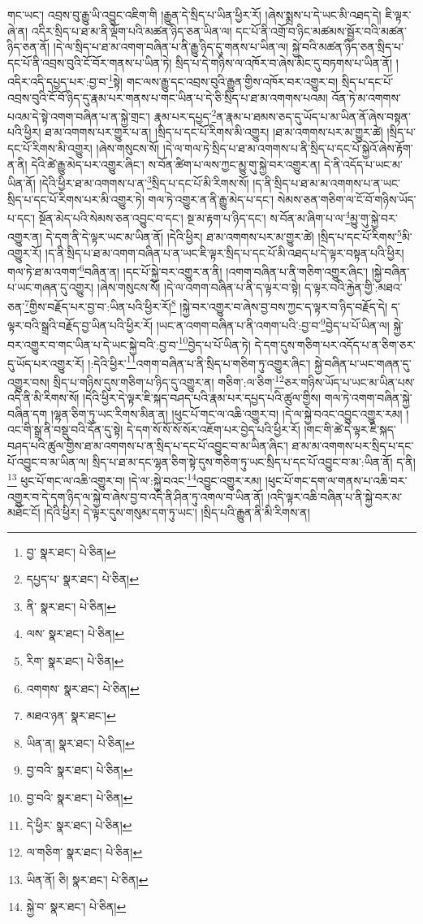 གང་ཡང་། འབྲས་བུ་རྒྱུ་ཡི་འབྱུང་འཇིག་གི །རྒྱུན་དེ་སྲིད་པ་ཡིན་ཕྱིར་རོ། །ཞེས་སྨྲས་པ་དེ་ཡང་མི་འཐད་དེ། ཇི་ལྟར་ཞེ་ན། འདིར་སྲིད་པ་ཐ་མ་ནི་ལྡོག་པའི་མཚན་ཉིད་ཅན་ཡིན་ལ། དང་པོ་ནི་འགྲོ་བ་ཉིང་མཚམས་སྦྱོར་བའི་མཚན་ཉིད་ཅན་ནོ། །དེ་ལ་སྲིད་པ་ཐ་མ་འགག་བཞིན་པ་ནི་རྒྱུ་ཉིད་དུ་གནས་པ་ཡིན་ལ། སྐྱེ་བའི་མཚན་ཉིད་ཅན་སྲིད་པ་དང་པོ་ནི་འབྲས་བུའི་ངོ་བོར་གནས་པ་ཡིན་ཏེ། སྲིད་པ་དེ་གཉིས་ལ་འཁོར་བ་ཞེས་མིང་དུ་བཏགས་པ་ཡིན་ནོ། །འདིར་འདི་དཔྱད་པར་:བྱ་བ་\footnote{བྱ་  སྣར་ཐང་།  པེ་ཅིན། }སྟེ། གང་ལས་རྒྱུ་དང་འབྲས་བུའི་རྒྱུན་གྱིས་འཁོར་བར་འགྱུར་བ། སྲིད་པ་དང་པོ་འབྲས་བུའི་ངོ་བོ་ཉིད་དུ་རྣམ་པར་གནས་པ་གང་ཡིན་པ་དེ་ཅི་སྲིད་པ་ཐ་མ་འགགས་པའམ། འོན་ཏེ་མ་འགགས་པའམ་དེ་སྟེ་འགག་བཞིན་པ་ན་སྐྱེ་གྲང་། རྣམ་པར་དཔྱད་\footnote{དཔྱད་པ་  སྣར་ཐང་།  པེ་ཅིན། }ན་རྣམ་པ་ཐམས་ཅད་དུ་ཡོད་པ་མ་ཡིན་ནོ་ཞེས་བསྟན་པའི་ཕྱིར། ཐ་མ་འགགས་པར་གྱུར་པ་ན། །སྲིད་པ་དང་པོ་རིགས་མི་འགྱུར། །ཐ་མ་འགགས་པར་མ་གྱུར་ཚེ། །སྲིད་པ་དང་པོ་རིགས་མི་འགྱུར། །ཞེས་གསུངས་སོ། །དེ་ལ་གལ་ཏེ་སྲིད་པ་ཐ་མ་འགགས་པ་ནི་སྲིད་པ་དང་པོ་སྐྱེའོ་ཞེས་རྟོག་ན་ནི། དེའི་ཚེ་རྒྱུ་མེད་པར་འགྱུར་ཞིང་། ས་བོན་ཚིག་པ་ལས་ཀྱང་མྱུ་གུ་སྐྱེ་བར་འགྱུར་ན། དེ་ནི་འདོད་པ་ཡང་མ་ཡིན་ནོ། །དེའི་ཕྱིར་ཐ་མ་འགགས་པ་ན་\footnote{ནི་  སྣར་ཐང་།  པེ་ཅིན། }སྲིད་པ་དང་པོ་མི་རིགས་སོ། །ད་ནི་སྲིད་པ་ཐ་མ་མ་འགགས་པ་ན་ཡང་སྲིད་པ་དང་པོ་རིགས་པར་མི་འགྱུར་ཏེ། གལ་ཏེ་འགྱུར་ན་ནི་རྒྱུ་མེད་པ་དང་། སེམས་ཅན་གཅིག་ལ་ངོ་བོ་གཉིས་ཡོད་པ་དང་། སྔོན་མེད་པའི་སེམས་ཅན་འབྱུང་བ་དང་། སྔ་མ་རྟག་པ་ཉིད་དང་། ས་བོན་མ་ཞིག་པ་ལ་\footnote{ལས་  སྣར་ཐང་།  པེ་ཅིན། }མྱུ་གུ་སྐྱེ་བར་འགྱུར་ན། དེ་དག་ནི་དེ་ལྟར་ཡང་མ་ཡིན་ནོ། །དེའི་ཕྱིར། ཐ་མ་འགགས་པར་མ་གྱུར་ཚེ། །སྲིད་པ་དང་པོ་རིགས་\footnote{རིག་  སྣར་ཐང་།  པེ་ཅིན། }མི་འགྱུར་རོ། །ད་ནི་སྲིད་པ་ཐ་མ་འགག་བཞིན་པ་ན་ཡང་ཇི་ལྟར་སྲིད་པ་དང་པོ་མི་འཐད་པ་དེ་ལྟར་བསྟན་པའི་ཕྱིར། གལ་ཏེ་ཐ་མ་འགག་\footnote{འགགས་  སྣར་ཐང་།  པེ་ཅིན། }བཞིན་ན། །དང་པོ་སྐྱེ་བར་འགྱུར་ན་ནི། །འགག་བཞིན་པ་ནི་གཅིག་འགྱུར་ཞིང་། །སྐྱེ་བཞིན་པ་ཡང་གཞན་དུ་འགྱུར། །ཞེས་གསུངས་སོ། །དེ་ལ་འགག་བཞིན་པ་ནི་ད་ལྟར་བ་སྟེ། ད་ལྟར་བའི་རྐྱེན་གྱི་:མཐའ་ཅན་\footnote{མཐའ་ཉན་  སྣར་ཐང་། }གྱིས་བརྗོད་པར་བྱ་བ་:ཡིན་པའི་ཕྱིར་རོ།\footnote{ཡིན་ན།  སྣར་ཐང་།  པེ་ཅིན། } །སྐྱེ་བར་འགྱུར་བ་ཞེས་བྱ་བས་ཀྱང་ད་ལྟར་བ་ཉིད་བརྗོད་དེ། ད་ལྟར་བའི་སྒྲའི་བརྗོད་བྱ་ཡིན་པའི་ཕྱིར་རོ། །ཡང་ན་འགག་བཞིན་པ་ནི་འགག་པའི་:བྱ་བ་\footnote{བྱ་བའི་  སྣར་ཐང་།  པེ་ཅིན། }བྱེད་པ་པོ་ཡིན་ལ། སྐྱེ་བར་འགྱུར་བ་གང་ཡིན་པ་དེ་ཡང་སྐྱེ་བའི་:བྱ་བ་\footnote{བྱ་བའི་  སྣར་ཐང་།  པེ་ཅིན། }བྱེད་པ་པོ་ཡིན་ཏེ། དེ་དག་དུས་གཅིག་པར་འདོད་པ་ན་ཅིག་ཅར་དུ་ཡོད་པར་འགྱུར་རོ། །:དེའི་ཕྱིར་\footnote{དེ་ཕྱིར་  སྣར་ཐང་།  པེ་ཅིན། }འགག་བཞིན་པ་ནི་སྲིད་པ་གཅིག་ཏུ་འགྱུར་ཞིང་། སྐྱེ་བཞིན་པ་ཡང་གཞན་དུ་འགྱུར་བས། སྲིད་པ་གཉིས་དུས་གཅིག་པ་ཉིད་དུ་འགྱུར་ན། གཅིག་:ལ་ཅིག་\footnote{ལ་གཅིག་  སྣར་ཐང་།  པེ་ཅིན། }ཅར་གཉིས་ཡོད་པ་ཡང་མ་ཡིན་པས་འདི་ནི་མི་རིགས་སོ། །དེའི་ཕྱིར་དེ་ལྟར་ཇི་སྐད་བཤད་པའི་རྣམ་པར་དཔྱད་པའི་ཚུལ་གྱིས། གལ་ཏེ་འགག་བཞིན་སྐྱེ་བཞིན་དག །ལྷན་ཅིག་ཏུ་ཡང་རིགས་མིན་ན། །ཕུང་པོ་གང་ལ་འཆི་འགྱུར་བ། །དེ་ལ་སྐྱེ་བའང་འབྱུང་འགྱུར་རམ། །འང་གི་སྒྲ་ནི་བསྡུ་བའི་དོན་དུ་སྟེ། དེ་དག་སོ་སོ་སོ་སོར་འཇོག་པར་བྱེད་པའི་ཕྱིར་རོ། །གང་གི་ཚེ་དེ་ལྟར་ཇི་སྐད་བཤད་པའི་ཚུལ་གྱིས་ཐ་མ་འགགས་པ་ན་སྲིད་པ་དང་པོ་འབྱུང་བ་མ་ཡིན་ཞིང་། ཐ་མ་མ་འགགས་པར་སྲིད་པ་དང་པོ་འབྱུང་བ་མ་ཡིན་ལ། སྲིད་པ་ཐ་མ་དང་ལྷན་ཅིག་སྟེ་དུས་གཅིག་ཏུ་ཡང་སྲིད་པ་དང་པོ་འབྱུང་བ་མ་:ཡིན་ནོ། ད་ནི།\footnote{ཡིན་ནོ། ཅི།  སྣར་ཐང་།  པེ་ཅིན། } ཕུང་པོ་གང་ལ་འཆི་འགྱུར་བ། །དེ་ལ་:སྐྱེ་བའང་\footnote{སྐྱེ་བ་  སྣར་ཐང་།  པེ་ཅིན། }འབྱུང་འགྱུར་རམ། །ཕུང་པོ་གང་དག་ལ་གནས་པ་འཆི་བར་འགྱུར་བ་དེ་དག་ཉིད་ལ་སྐྱེ་བ་ཞེས་བྱ་བ་འདི་ནི་ཤིན་ཏུ་འགལ་བ་ཡིན་ནོ། །འདི་ལྟར་འཆི་བཞིན་པ་ནི་སྐྱེ་བར་མ་མཐོང་ངོ། །དེའི་ཕྱིར། དེ་ལྟར་དུས་གསུམ་དག་ཏུ་ཡང་། །སྲིད་པའི་རྒྱུན་ནི་མི་རིགས་ན། 